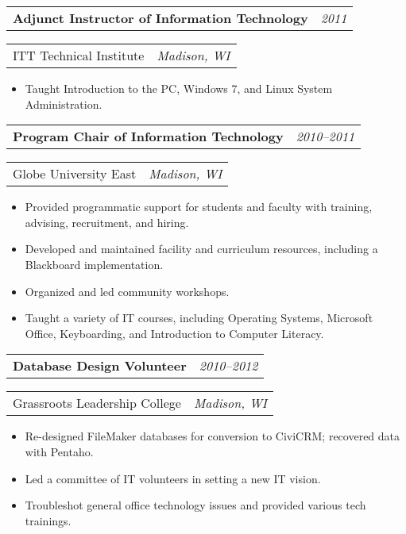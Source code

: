 \documentclass[letterpaper,11pt]{article}
\newcommand{\resitem}[1]{\item #1 \vspace{-8pt}}
\newcommand{\ressubheading}[4]{\vspace{4pt}
	\begin{tabularx}{\textwidth}{X r}
		\textbf{#1} & \textit{#4}
	\end{tabularx}

	\begin{tabularx}{\textwidth}{X r}
		#2 & \textit{#3}
	\end{tabularx}\vspace{-6pt}
	
}
\begin{document}
	\ressubheading{Adjunct Instructor of Information Technology}{ITT Technical Institute}{Madison, WI}{2011}
	\begin{itemize}
		\resitem{Taught Introduction to the PC, Windows 7, and Linux System Administration.}
	\end{itemize}

	\ressubheading{Program Chair of Information Technology}{Globe University East}{Madison, WI}{2010--2011}
	\begin{itemize}
		\resitem{Provided programmatic support for students and faculty with training, advising, recruitment, and hiring.}
		\resitem{Developed and maintained facility and curriculum resources, including a Blackboard implementation.}
		\resitem{Organized and led community workshops.}
		\resitem{Taught a variety of IT courses, including Operating Systems, Microsoft Office, Keyboarding, and Introduction to Computer Literacy.}
	\end{itemize}

\pagebreak

	\ressubheading{Database Design Volunteer}{Grassroots Leadership College}{Madison, WI}{2010--2012}
	\begin{itemize}
		\resitem{Re-designed FileMaker databases for conversion to CiviCRM; recovered data with Pentaho.}
		\resitem{Led a committee of IT volunteers in setting a new IT vision.}
		\resitem{Troubleshot general office technology issues and provided various tech trainings.}
	\end{itemize}
\end{document}
